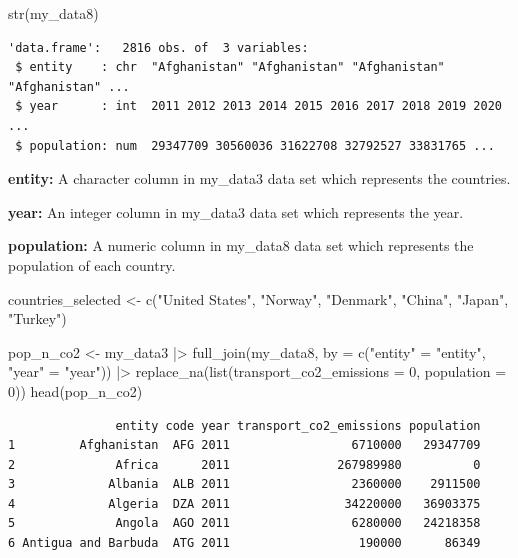 \documentclass[
  11pt,
  a4paper,
  DIV=11,
  numbers=noendperiod]{scrartcl}
\newenvironment{Shaded}{\begin{snugshade}}{\end{snugshade}}
\newcommand{\AttributeTok}[1]{\textcolor[rgb]{0.40,0.45,0.13}{#1}}
\newcommand{\DecValTok}[1]{\textcolor[rgb]{0.68,0.00,0.00}{#1}}
\newcommand{\FunctionTok}[1]{\textcolor[rgb]{0.28,0.35,0.67}{#1}}
\newcommand{\NormalTok}[1]{\textcolor[rgb]{0.00,0.23,0.31}{#1}}
\newcommand{\OtherTok}[1]{\textcolor[rgb]{0.00,0.23,0.31}{#1}}
\newcommand{\SpecialCharTok}[1]{\textcolor[rgb]{0.37,0.37,0.37}{#1}}
\newcommand{\StringTok}[1]{\textcolor[rgb]{0.13,0.47,0.30}{#1}}
\begin{document}
\begin{Shaded}
\begin{Highlighting}[]
\FunctionTok{str}\NormalTok{(my\_data8)}
\end{Highlighting}
\end{Shaded}

\begin{verbatim}
'data.frame':   2816 obs. of  3 variables:
 $ entity    : chr  "Afghanistan" "Afghanistan" "Afghanistan" "Afghanistan" ...
 $ year      : int  2011 2012 2013 2014 2015 2016 2017 2018 2019 2020 ...
 $ population: num  29347709 30560036 31622708 32792527 33831765 ...
\end{verbatim}

\textbf{entity:} A character column in my\_data3 data set which
represents the countries.

\textbf{year:} An integer column in my\_data3 data set which represents
the year.

\textbf{population:} A numeric column in my\_data8 data set which
represents the population of each country.

\begin{Shaded}
\begin{Highlighting}[]
\NormalTok{countries\_selected }\OtherTok{\textless{}{-}} \FunctionTok{c}\NormalTok{(}\StringTok{"United States"}\NormalTok{, }\StringTok{"Norway"}\NormalTok{, }\StringTok{"Denmark"}\NormalTok{, }\StringTok{"China"}\NormalTok{, }\StringTok{"Japan"}\NormalTok{, }\StringTok{"Turkey"}\NormalTok{)}

\NormalTok{pop\_n\_co2 }\OtherTok{\textless{}{-}}\NormalTok{ my\_data3 }\SpecialCharTok{|\textgreater{}}
  \FunctionTok{full\_join}\NormalTok{(my\_data8, }\AttributeTok{by =} \FunctionTok{c}\NormalTok{(}\StringTok{"entity"} \OtherTok{=} \StringTok{"entity"}\NormalTok{, }\StringTok{"year"} \OtherTok{=} \StringTok{"year"}\NormalTok{)) }\SpecialCharTok{|\textgreater{}}
  \FunctionTok{replace\_na}\NormalTok{(}\FunctionTok{list}\NormalTok{(}\AttributeTok{transport\_co2\_emissions =} \DecValTok{0}\NormalTok{, }\AttributeTok{population =} \DecValTok{0}\NormalTok{))}
\FunctionTok{head}\NormalTok{(pop\_n\_co2)}
\end{Highlighting}
\end{Shaded}

\begin{verbatim}
               entity code year transport_co2_emissions population
1         Afghanistan  AFG 2011                 6710000   29347709
2              Africa      2011               267989980          0
3             Albania  ALB 2011                 2360000    2911500
4             Algeria  DZA 2011                34220000   36903375
5              Angola  AGO 2011                 6280000   24218358
6 Antigua and Barbuda  ATG 2011                  190000      86349
\end{verbatim}
\end{document}
